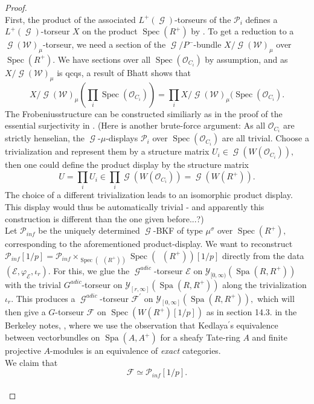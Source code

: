 \documentclass[a4paper,10,5 pt]{amsart}
\theoremstyle{definition}
\DeclareMathOperator{\Spec}{Spec}
\DeclareMathOperator{\Spa}{Spa}
\DeclareMathOperator{\Ainf}{\mathbb{A}_{inf}}
\DeclareMathOperator{\G}{\mathcal{G}}
\begin{document}
\begin{proof}
\\
First, the product of the associated $L^{+}(\G)$-torseurs of the $\mathcal{P}_{i}$ defines a $L^{+}(\G)$-torseur $X$ on the product $\Spec(R^{+})$ by \cite[Lemma B.0.4.]{BP}. To get a reduction to a $\G(\mathcal{W})_{\mu}$-torseur, we need a section of the $\G/P^{-}$-bundle $X/\G(\mathcal{W})_{\mu}$ over $\Spec(R^{+}).$ We have sections over all $\Spec(\mathcal{O}_{C_{i}})$ by assumption, and as $X/\G(\mathcal{W})_{\mu}$ is qcqs, a result of Bhatt shows that 
$$
X/\G(\mathcal{W})_{\mu}(\prod_{i}\Spec(\mathcal{O}_{C_{i}}))=\prod_{i} X/\G(\mathcal{W})_{\mu}(\Spec(\mathcal{O}_{C_{i}}).
$$
The Frobeniusstructure can be constructed similiarly as in the proof of the essential surjectivity in \cite[Lemma B.0.4.]{BP}.
(Here is another brute-force argument: As all $\mathcal{O}_{C_{i}}$ are strictly henselian, the $\G$-$\mu$-displays $\mathcal{P}_{i}$ over $\Spec(\mathcal{O}_{C_{i}})$ are all trivial. Choose a trivialization and represent them by a structure matrix $U_{i}\in \G(W(\mathcal{O}_{C_{i}})),$ then one could define the product display by the structure matrix
$$
U=\prod_{i} U_{i}\in \prod_{i} \G(W(\mathcal{O}_{C_{i}})) = \G(W(R^{+})).
$$ 
The choice of a different trivialization leads to an isomorphic product display. This display would thus be automatically trivial - and apparently this construction is different than the one given before...?)
\\
Let $\mathcal{P}_{inf}$ be the uniquely determined $\G$-BKF of type $\mu^{\sigma}$ over $\Spec(R^{+}),$ corresponding to the aforementioned product-display. We want to reconstruct $\mathcal{P}_{inf}[1/p]=\mathcal{P}_{inf}\times_{\Spec(\Ainf(R^{+}))} \Spec(\Ainf(R^{+}))[1/p]$ directly from the data  $(\mathcal{E},\varphi_{\mathcal{E}},\iota_{r}).$
For this, we glue the $\G^{adic}$-torseur $\mathcal{E}$ on $\mathcal{Y}_{[0,\infty)}(\Spa(R,R^{+}))$ with the trivial $G^{adic}$-torseur on $\mathcal{Y}_{[r,\infty]}(\Spa(R,R^{+}))$ along the trivialization $\iota_{r}.$ This produces a $\G^{adic}$-torseur $\mathcal{F}^{\prime}$ on $\mathcal{Y}_{[0,\infty]}(\Spa(R,R^{+})),$ which will then give a $G$-torseur $\mathcal{F}$ on $\Spec(W(R^{+})[1/p])$ as in section 14.3. in the Berkeley notes, \cite{Berkeley lectures}, where we use the observation that Kedlaya$^{\prime}$s equivalence between vectorbundles on $\Spa(A,A^{+})$ for a sheafy Tate-ring $A$ and finite projective $A$-modules is an equivalence of \textit{exact} categories.
\\
We claim that
$$
\mathcal{F}\simeq \mathcal{P}_{inf}[1/p].
$$
\\

\end{proof}
\end{document}
